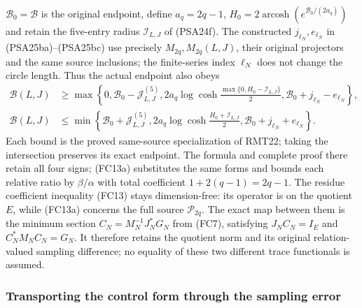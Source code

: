 $\mathcal B_0=\mathcal B$ is the original endpoint, define
$a_q=2q-1$, $H_0=2\operatorname{arcosh}(e^{\mathcal B_0/(2a_q)})$
and retain the five-entry radius $\mathcal I_{L,J}$ of (PSA24f).
The constructed $j_{\ell_N},e_{\ell_N}$ in
(PSA25ba)--(PSA25bc) use precisely $M_{2q},M_{2q}(L,J)$,
their original projectors and the same source inclusions; the
finite-series index $\ell_N$ does not change the circle length.
Thus the actual endpoint also obeys
\[
 \begin{aligned}
 \mathcal B(L,J)&\ge\max\left\{0,
 \mathcal B_0-\mathcal J^{(5)}_{L,J},
 2a_q\log\cosh\frac{\max\{0,H_0-\mathcal I_{L,J}\}}2,
 \mathcal B_0+j_{\ell_N}-e_{\ell_N}\right\},\\
 \mathcal B(L,J)&\le\min\left\{
 \mathcal B_0+\mathcal J^{(5)}_{L,J},
 2a_q\log\cosh\frac{H_0+\mathcal I_{L,J}}2,
 \mathcal B_0+j_{\ell_N}+e_{\ell_N}\right\}.
 \end{aligned}\tag{FC13b}
\]
Each bound is the proved same-source specialization of
RMT22; taking the intersection preserves its exact endpoint. The formula and complete proof there retain
all four signs; (FC13a) substitutes the same forms and bounds
each relative ratio by $\beta/\alpha$ with total coefficient
$1+2(q-1)=2q-1$. The residue coefficient inequality (FC13) stays
dimension-free: its operator is on the quotient $E$, while
(FC13a) concerns the full source $\mathcal P_{2q}$.
The exact map between them is the minimum section
$C_N=M_N^{-1}J_N^*G_N$ from (FC7), satisfying
$J_NC_N=I_E$ and $C_N^*M_NC_N=G_N$. It therefore retains the
quotient norm and its original relation-valued sampling difference;
no equality of these two different trace functionals is assumed.

\subsubsection{Transporting the control form through the sampling error}

